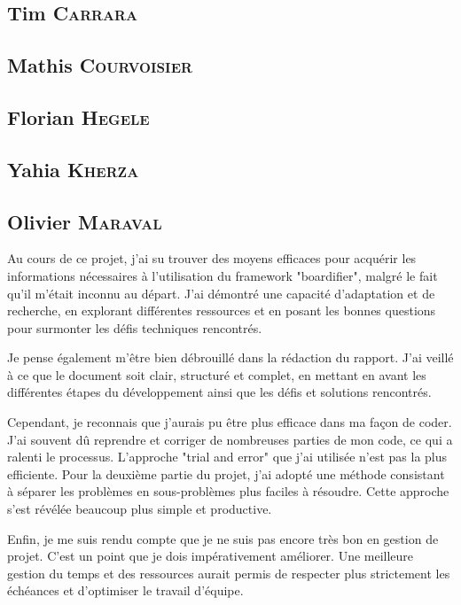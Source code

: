 \subsection*{Tim \textsc{Carrara}}

\subsection*{Mathis \textsc{Courvoisier}}

\subsection*{Florian \textsc{Hegele}}

\subsection*{Yahia \textsc{Kherza}}


\subsection*{Olivier \textsc{Maraval}}

Au cours de ce projet, j'ai su trouver des moyens efficaces pour acquérir les informations nécessaires à l'utilisation du framework "boardifier", malgré le fait qu'il m'était inconnu au départ. J'ai démontré une capacité d'adaptation et de recherche, en explorant différentes ressources et en posant les bonnes questions pour surmonter les défis techniques rencontrés.

Je pense également m'être bien débrouillé dans la rédaction du rapport. J'ai veillé à ce que le document soit clair, structuré et complet, en mettant en avant les différentes étapes du développement ainsi que les défis et solutions rencontrés.

Cependant, je reconnais que j'aurais pu être plus efficace dans ma façon de coder. J'ai souvent dû reprendre et corriger de nombreuses parties de mon code, ce qui a ralenti le processus. L'approche "trial and error" que j'ai utilisée n'est pas la plus efficiente. Pour la deuxième partie du projet, j'ai adopté une méthode consistant à séparer les problèmes en sous-problèmes plus faciles à résoudre. Cette approche s'est révélée beaucoup plus simple et productive.

Enfin, je me suis rendu compte que je ne suis pas encore très bon en gestion de projet. C'est un point que je dois impérativement améliorer. Une meilleure gestion du temps et des ressources aurait permis de respecter plus strictement les échéances et d'optimiser le travail d'équipe.

